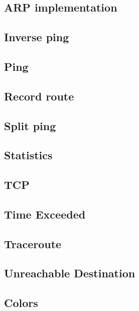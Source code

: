 \subsection{ARP implementation}

\clearpage
\subsection{Inverse ping}

\clearpage
\subsection{Ping}

\clearpage
\subsection{Record route}

\clearpage
\subsection{Split ping}

\clearpage
\subsection{Statistics}

\clearpage
\subsection{TCP}

\clearpage
\subsection{Time Exceeded}

\clearpage
\subsection{Traceroute}

\clearpage
\subsection{Unreachable Destination}

\subsection{Colors}

